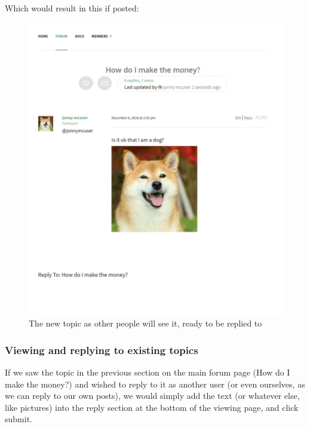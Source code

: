 \documentclass[10pt]{article}
\begin{document}
\begin{flushleft}
Which would result in this if posted:
\end{flushleft}

\begin{figure}[H]
    \centering
    \includegraphics[scale=0.4]{images/viewnewpost.jpg}
    \caption{The new topic as other people will see it, ready to be replied to}
    \label{newtopic2}
\end{figure}

\subsubsection{Viewing and replying to existing topics}

\begin{flushleft}
If we saw the topic in the previous section on the main forum page (How do I make the money?) and wished to reply to it as another user (or even ourselves, as we can reply to our own posts), we would simply add the text (or whatever else, like pictures) into the reply section at the bottom of the viewing page, and click submit. 
\end{flushleft}
\end{document}
